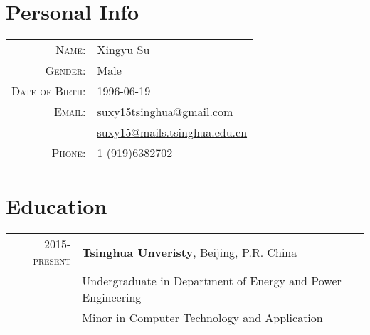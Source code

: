 \documentclass[a4paper,10pt]{article}
\begin{document}
\pagestyle{empty} %

\par{\bigskip\par}

\section{Personal Info}
\begin{tabular}{rl}
    \textsc{Name:}          & Xingyu Su \\
    \textsc{Gender:}        & Male \\
    \textsc{Date of Birth:} & 1996-06-19 \\
    \textsc{Email:}         & \href{mailto:suxy15tsinghua@gmail.com}{suxy15tsinghua@gmail.com} \\
                            & \href{mailto:suxy15@mails.tsinghua.edu.cn}{suxy15@mails.tsinghua.edu.cn} \\
    \textsc{Phone:}         & 1 (919)6382702 \\
\end{tabular}

\section{Education}
\begin{tabular}{rl}
\textsc{2015-present} & \normalsize\textbf{Tsinghua Unveristy}, Beijing, P.R. China \\
                      & Undergraduate in Department of Energy and Power Engineering \\
                      & Minor in Computer Technology and Application \\
\end{tabular}

\end{document}
